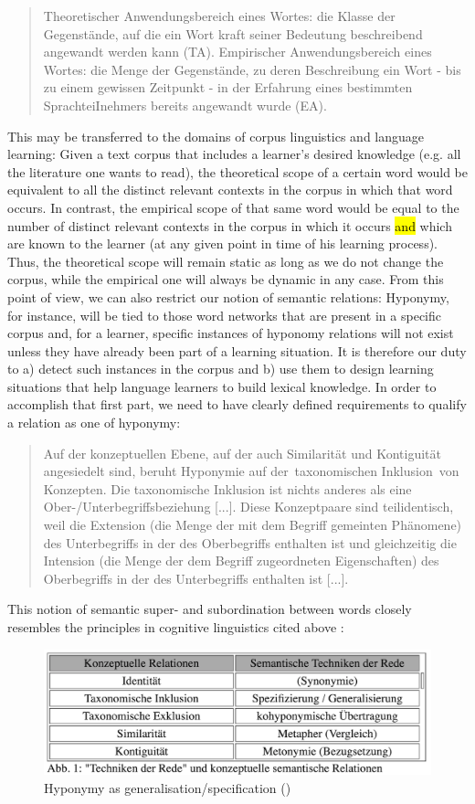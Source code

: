 \documentclass[jou]{apa6} %
\begin{document}
\blockquote[{\cite[p.~46]{coenenAnalogieUndMetapher2013}}]{Theoretischer Anwendungsbereich eines Wortes: die Klasse der Gegenstände, auf die ein Wort kraft seiner Bedeutung beschreibend angewandt werden kann (TA). Empirischer Anwendungsbereich eines Wortes: die Menge der Gegenstände, zu deren Beschreibung ein Wort - bis zu einem gewissen Zeitpunkt - in der Erfahrung eines bestimmten SprachteiInehmers bereits angewandt wurde (EA).}
This may be transferred to the domains of corpus linguistics and language learning: Given a text corpus that includes a learner's desired knowledge (e.g. all the literature one wants to read), the theoretical scope of a certain word would be equivalent to all the distinct relevant contexts in the corpus in which that word occurs. In contrast, the empirical scope of that same word would be equal to the number of distinct relevant contexts in the corpus in which it occurs \hl{and} which are known to the learner (at any given point in time of his learning process). Thus, the theoretical scope will remain static as long as we do not change the corpus, while the empirical one will always be dynamic in any case. From this point of view, we can also restrict our notion of semantic relations: Hyponymy, for instance, will be tied to those word networks that are present in a specific corpus and, for a learner, specific instances of hyponomy relations will not exist unless they have already been part of a learning situation. It is therefore our duty to a) detect such instances in the corpus and b) use them to design learning situations that help language learners to build lexical knowledge. In order to accomplish that first part, we need to have clearly defined requirements to qualify a relation as one of hyponymy:
\blockquote[{\cite[p.~16]{gevaudanSemantischeRelationenNominalen1999}}]{Auf der konzeptuellen Ebene, auf der auch Similarität und Kontiguität angesiedelt sind, beruht Hyponymie auf der taxonomischen Inklusion von Konzepten. Die taxonomische Inklusion ist nichts anderes als eine Ober-/Unterbegriffsbeziehung [...]. Diese Konzeptpaare sind teilidentisch, weil die Extension (die Menge der mit dem Begriff gemeinten Phänomene) des Unterbegriffs in der des Oberbegriffs enthalten ist und gleichzeitig die Intension (die Menge der dem Begriff zugeordneten Eigenschaften) des Oberbegriffs in der des Unterbegriffs enthalten ist [...].}
This notion of semantic super- and subordination between words closely resembles the principles in cognitive linguistics cited above \cite[p.~5]{nerlichPolysemyFlexibilityIntroduction2003}:
\begin{figure}[h]
\includegraphics[width=\linewidth]{hyponymy_generalization_specification}
\caption{Hyponymy as generalisation/specification (\cite[p.~18]{gevaudanSemantischeRelationenNominalen1999})}
\end{figure}
\end{document}
